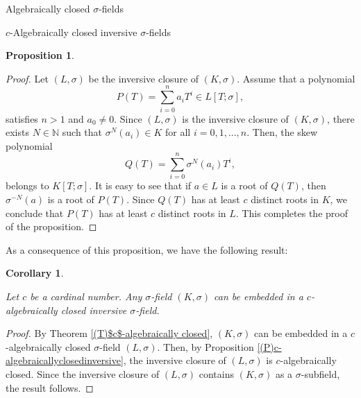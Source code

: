 \documentclass[11pt,a4paper]{article}
\theoremstyle{theorem}
\newtheorem{corollary}[theorem]{Corollary}
\newtheorem{proposition}[theorem]{Proposition}
\numberwithin{equation}{section}
\newcommand{\s}{\sigma}
\begin{document}
\begin{section}{Algebraically closed $\s$-fields}
\begin{subsection}{$c$-Algebraically closed inversive $\s$-fields}
\begin{proposition}
	\end{proposition}
	\begin{proof}
		Let $(L,\sigma)$ be the inversive closure of $(K,\sigma)$. Assume that a polynomial $$P(T)=\sum_{i=0}^na_iT^i\in L[T;\s],$$ satisfies $n>1$ and $a_0\neq 0$.
		Since $(L,\sigma)$  is the inversive closure of $(K,\sigma)$, 
		there exists $N\in \mathbb{N}$ such that 
		$\s^N(a_i)\in K$ for all $i=0,1,...,n$. Then, the skew polynomial
		$$Q(T)=\sum_{i=0}^n\s^N(a_i)T^i,$$
		belongs to $ K[T;\s]$.  It is easy to see that if $a\in L$ is a root of $Q(T)$, then $\s^{-N}(a)$ is a root of $P(T)$. Since $Q(T)$ has at least $c$ distinct roots in $K$, we conclude that $P(T)$ has   at least  $c$ distinct roots in $L$. This completes the proof of the proposition. 
	\end{proof}
	As a consequence of this proposition, we have the following result:
	\begin{corollary}\label{(T)embed$c$-algebraicallyclosedinversive}
		
		Let $c$ be a cardinal number. Any $\s$-field $(K,\sigma)$ can be embedded in  a $c$-algebraically closed inversive $\s$-field.
		
	\end{corollary}
	\begin{proof}
		By Theorem \ref{(T)$c$-algebraically closed}, $(K,\s)$ can be embedded in a  $c$-algebraically closed  $\s$-field $(L,\s)$. Then, by Proposition \ref{(P)c-algebraicallyclosedinversive}, the inversive closure of $(L,\s)$ is  $c$-algebraically closed. Since  the inversive closure of $(L,\s)$ contains $(K,\s)$ as a $\s$-subfield, the result follows. 
	\end{proof}

\end{subsection}

\end{section} 
\end{document}
